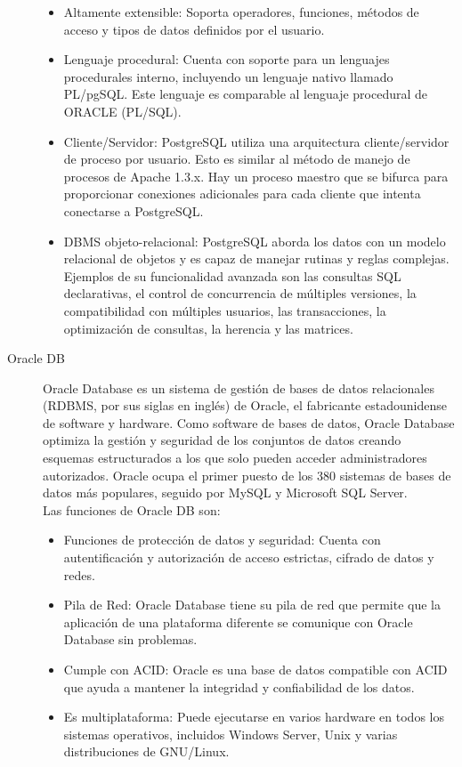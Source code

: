 \begin{description}
\begin{itemize}
            \item Altamente extensible: Soporta operadores, funciones, métodos de acceso y tipos de datos definidos por el usuario.
            \item Lenguaje procedural: Cuenta con soporte para un lenguajes procedurales interno, incluyendo un lenguaje nativo llamado PL/pgSQL. Este lenguaje es comparable al lenguaje procedural de ORACLE (PL/SQL).
            \item Cliente/Servidor: PostgreSQL utiliza una arquitectura cliente/servidor de proceso por usuario. Esto es similar al método de manejo de procesos de Apache 1.3.x. Hay un proceso maestro que se bifurca para proporcionar conexiones adicionales para cada cliente que intenta conectarse a PostgreSQL.
            \item DBMS objeto-relacional: PostgreSQL aborda los datos con un modelo relacional de objetos y es capaz de manejar rutinas y reglas complejas. Ejemplos de su funcionalidad avanzada son las consultas SQL declarativas, el control de concurrencia de múltiples versiones, la compatibilidad con múltiples usuarios, las transacciones, la optimización de consultas, la herencia y las matrices.
\end{itemize}
    \item[Oracle DB] Oracle Database es un sistema de gestión de bases de datos relacionales (RDBMS, por sus siglas en inglés) de Oracle, el fabricante estadounidense de software y hardware. Como software de bases de datos, Oracle Database optimiza la gestión y seguridad de los conjuntos de datos creando esquemas estructurados a los que solo pueden acceder administradores autorizados. Oracle ocupa el primer puesto de los 380 sistemas de bases de datos más populares, seguido por MySQL y Microsoft SQL Server. \\
        Las funciones de Oracle DB son:
        \begin{itemize}
            \item Funciones de protección de datos y seguridad: Cuenta con autentificación y autorización de acceso estrictas, cifrado de datos y redes.
            \item Pila de Red: Oracle Database tiene su pila de red que permite que la aplicación de una plataforma diferente se comunique con Oracle Database sin problemas. 
            \item Cumple con ACID: Oracle es una base de datos compatible con ACID que ayuda a mantener la integridad y confiabilidad de los datos.
            \item Es multiplataforma: Puede ejecutarse en varios hardware en todos los sistemas operativos, incluidos Windows Server, Unix y varias distribuciones de GNU/Linux.
\end{itemize}
        
    \end{description}


